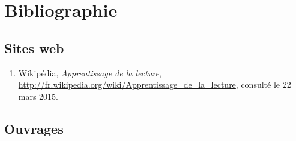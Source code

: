 \section*{Bibliographie}

\subsection*{Sites web}
\begin{enumerate}
\item Wikipédia, \textit{Apprentissage de la lecture}, \url{http://fr.wikipedia.org/wiki/Apprentissage_de_la_lecture}, consulté le 22 mars 2015.
\end{enumerate}

\subsection{Ouvrages}
